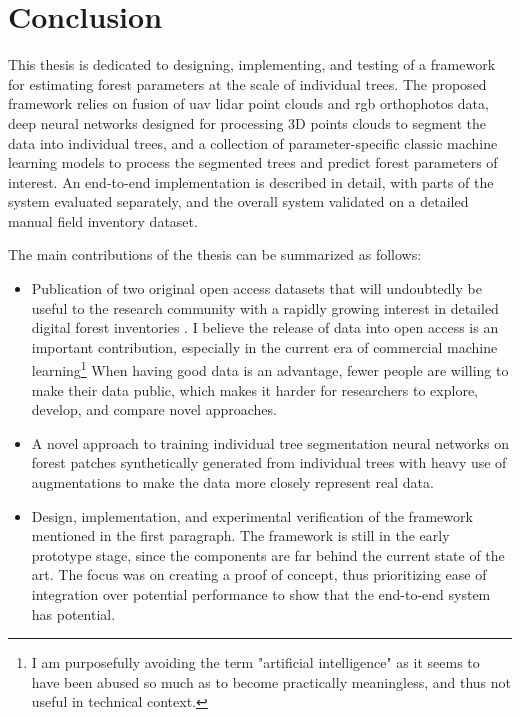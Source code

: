 \chapter{Conclusion}\label{cap:conclusion}


This thesis is dedicated to designing, implementing, and testing of a framework for estimating forest parameters at the scale of individual trees.
The proposed framework relies on fusion of \gls{uav} \gls{lidar} point clouds and \gls{rgb} orthophotos data, deep neural networks designed for processing 3D points clouds to segment the data into individual trees, and a collection of parameter-specific classic machine learning models to process the segmented trees and predict forest parameters of interest.
An end-to-end implementation is described in detail, with parts of the system evaluated separately, and the overall system validated on a detailed manual field inventory dataset.

The main contributions of the thesis can be summarized as follows:

\begin{itemize}
\item Publication of two original open access datasets that will undoubtedly be useful to the research community with a rapidly growing interest in detailed digital forest inventories \citep{dubrovinExplorationPropertiesPoint2024, dubrovinOpenDatasetIndividual2024}.
I believe the release of data into open access is an important contribution, especially in the current era of commercial machine learning\footnote{I am purposefully avoiding the term "artificial intelligence" as it seems to have been abused so much as to become practically meaningless, and thus not useful in technical context.}
When having good data is an advantage, fewer people are willing to make their data public, which makes it harder for researchers to explore, develop, and compare novel approaches.
\item A novel approach to training individual tree segmentation neural networks on forest patches synthetically generated from individual trees with heavy use of augmentations to make the data more closely represent real data.
\item Design, implementation, and experimental verification of the framework mentioned in the first paragraph.
The framework is still in the early prototype stage, since the components are far behind the current state of the art.
The focus was on creating a proof of concept, thus prioritizing ease of integration over potential performance to show that the end-to-end system has potential.
\end{itemize}

